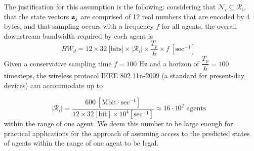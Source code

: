 \begin{bw_box}
\begin{remark}
The justification for this assumption is the following: considering that
$\mathcal{N}_i \subseteq \mathcal{R}_i$, that the state
vectors $\bm{\mathbf{z}}_j$ are comprised of 12 real numbers that are encoded by
4 bytes, and that sampling occurs with a frequency $f$ for all agents, the
overall downstream bandwidth required by each agent is
$$BW_d = 12 \times 32\ \text{[bits]} \times |\mathcal{R}_i| \times \dfrac{T_p}{h} \times f\ [\text{sec}^{-1}]$$
Given a conservative sampling time $f = 100$ Hz and a horizon of
$\dfrac{T_p}{h} = 100$ timesteps, the wireless protocol IEEE 802.11n-2009
(a standard for present-day devices) can accommodate up to

$$|\mathcal{R}_i| = \dfrac{600\ [\text{Mbit}\cdot \text{sec}^{-1}] }{12\times32[\text{bit}]\times10^4 [\text{sec}^{-1}]} \approx
16 \cdot 10^2 \text{ agents}$$ within the range of one agent.
We deem this number to be large enough for practical applications
for the approach of assuming access to the predicted states of agents
within the range of one agent to be legal.
\end{remark}
\end{bw_box}

